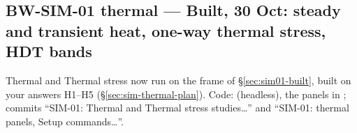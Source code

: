 \subsection{BW-SIM-01 thermal --- Built, 30 Oct: steady and transient heat, one-way thermal stress, HDT bands}\label{sec:sim-thermal-built}

Thermal and Thermal stress now run on the frame of \S\ref{sec:sim01-built}, built on your answers H1--H5
(\S\ref{sec:sim-thermal-plan}). Code:  (headless), the panels in
; commits ``SIM-01: Thermal and Thermal stress studies\ldots'' and ``SIM-01: thermal panels,
Setup commands\ldots''.

